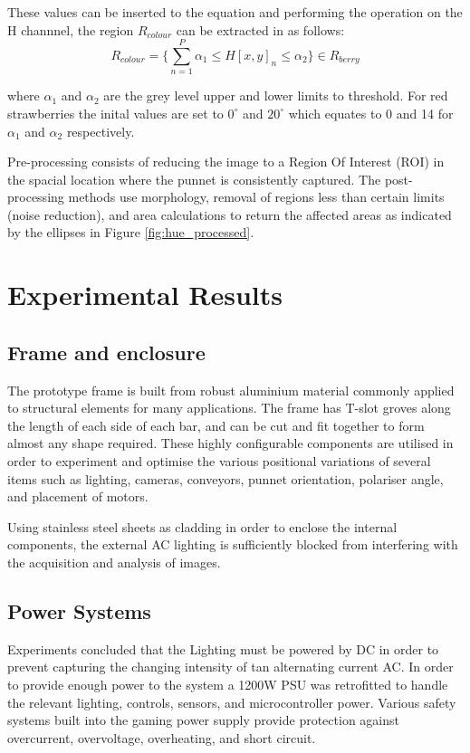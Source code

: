 \documentclass[fleqn,twoside,12pt]{report}
\begin{document}
These values can be inserted to the equation and performing the operation on the H channnel, the region $R_{colour}$ can be extracted in as follows:
\begin{equation}
R_{colour} = \bigg\{\sum_{n=1}^{P} \alpha_1 \leq H[x,y]_n \leq \alpha_2\bigg\} \in R_{berry}
\end{equation}


where $\alpha_1$ and $\alpha_2$ are the grey level upper and lower limits to threshold. For red strawberries the inital values are set to $0^{\circ}$ and $20^{\circ}$ which equates to 0 and 14 for $\alpha_1$ and $\alpha_2$ respectively.

Pre-processing consists of reducing the image to a Region Of Interest (ROI) in the spacial location where the punnet is consistently captured. The post-processing methods use morphology, removal of regions less than certain limits (noise reduction), and area calculations to return the affected areas as indicated by the ellipses in Figure \ref{fig:hue_processed}.


\section{Experimental Results}


\subsection{Frame and enclosure}

The prototype frame is built from robust aluminium material commonly applied to structural elements for many applications. The frame has T-slot groves along the length of each side of each bar, and can be cut and fit together to form almost any shape required. These highly configurable components are utilised in order to experiment and optimise the various positional variations of several items such as lighting, cameras, conveyors, punnet orientation, polariser angle, and placement of motors. 

Using stainless steel sheets as cladding in order to enclose the internal components, the external AC lighting is sufficiently blocked from interfering with the acquisition and analysis of images.   



\subsection{Power Systems}

Experiments concluded that the Lighting must be powered by DC in order to prevent capturing the changing intensity of tan alternating current AC. In order to provide enough power to the system a 1200W PSU was retrofitted to handle the relevant lighting, controls, sensors, and microcontroller power. Various safety systems built into the gaming power supply provide protection against overcurrent, overvoltage, overheating, and short circuit.
\end{document}
